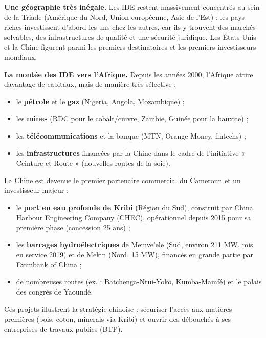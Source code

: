 \documentclass[11pt]{article}
\newcommand{\cle}[1]{{\popxbold\color{popdark}#1}}
\begin{document}
\textbf{Une géographie très inégale.} Les IDE restent massivement concentrés au sein de la \cle{Triade} (Amérique du Nord, Union européenne, Asie de l'Est) : les pays riches investissent d'abord les uns chez les autres, car ils y trouvent des marchés solvables, des infrastructures de qualité et une sécurité juridique. Les États-Unis et la Chine figurent parmi les premiers destinataires et les premiers investisseurs mondiaux.

\textbf{La montée des IDE vers l'Afrique.} Depuis les années 2000, l'Afrique attire davantage de capitaux, mais de manière très sélective :
\begin{itemize}
\item le \textbf{pétrole} et le \textbf{gaz} (Nigeria, Angola, Mozambique) ;
\item les \textbf{mines} (RDC pour le cobalt/cuivre, Zambie, Guinée pour la bauxite) ;
\item les \textbf{télécommunications} et la banque (MTN, Orange Money, fintechs) ;
\item les \textbf{infrastructures} financées par la Chine dans le cadre de l'initiative « Ceinture et Route » (nouvelles routes de la soie).
\end{itemize}

\begin{exemplebox}
La Chine est devenue le premier partenaire commercial du Cameroun et un investisseur majeur :
\begin{itemize}
\item le \textbf{port en eau profonde de Kribi} (Région du Sud), construit par China Harbour Engineering Company (CHEC), opérationnel depuis 2015 pour sa première phase (concession 25 ans) ;
\item les \textbf{barrages hydroélectriques} de Memve'ele (Sud, environ 211 MW, mis en service 2019) et de Mekin (Nord, 15 MW), financés en grande partie par Eximbank of China ;
\item de nombreuses routes (ex. : Batchenga-Ntui-Yoko, Kumba-Mamfé) et le palais des congrès de Yaoundé.
\end{itemize}
Ces projets illustrent la stratégie chinoise : sécuriser l'accès aux matières premières (bois, coton, minerais via Kribi) et ouvrir des débouchés à ses entreprises de travaux publics (BTP).
\end{exemplebox}
\end{document}
